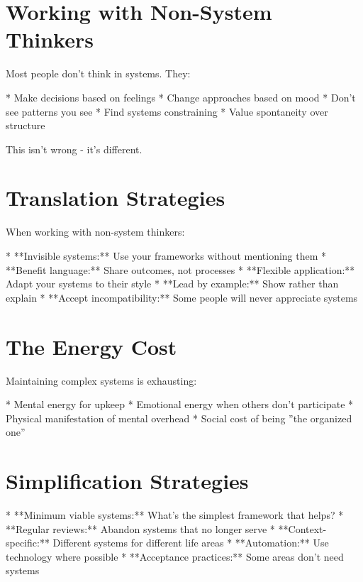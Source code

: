 \documentclass[12pt,oneside]{book}
\begin{document}
\section{Working with Non-System Thinkers}

Most people don't think in systems. They:

                    * Make decisions based on feelings
                    * Change approaches based on mood
                    * Don't see patterns you see
                    * Find systems constraining
                    * Value spontaneity over structure

This isn't wrong - it's different.

\section{Translation Strategies}

When working with non-system thinkers:

                    * **Invisible systems:** Use your frameworks without mentioning them
                    * **Benefit language:** Share outcomes, not processes
                    * **Flexible application:** Adapt your systems to their style
                    * **Lead by example:** Show rather than explain
                    * **Accept incompatibility:** Some people will never appreciate systems

\section{The Energy Cost}

Maintaining complex systems is exhausting:

                    * Mental energy for upkeep
                    * Emotional energy when others don't participate
                    * Physical manifestation of mental overhead
                    * Social cost of being ''the organized one''

\section{Simplification Strategies}

                    * **Minimum viable systems:** What's the simplest framework that helps?
                    * **Regular reviews:** Abandon systems that no longer serve
                    * **Context-specific:** Different systems for different life areas
                    * **Automation:** Use technology where possible
                    * **Acceptance practices:** Some areas don't need systems
\end{document}
